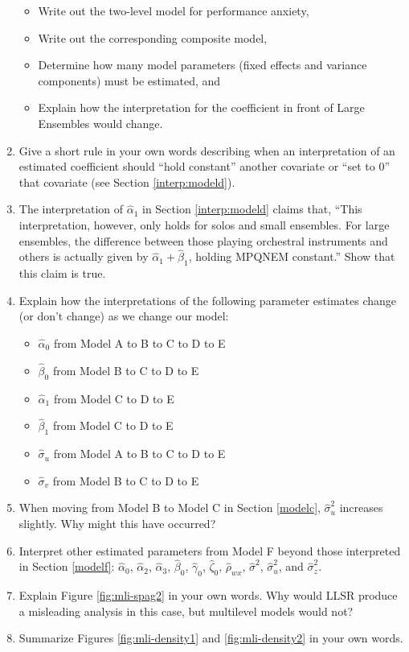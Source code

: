 \documentclass[
]{krantz}
\providecommand{\tightlist}{%
  \setlength{\itemsep}{0pt}\setlength{\parskip}{0pt}}
\begin{document}
\begin{enumerate}
  \begin{itemize}
  \tightlist
  \item
    Write out the two-level model for performance anxiety,
  \item
    Write out the corresponding composite model,
  \item
    Determine how many model parameters (fixed effects and variance components) must be estimated, and
  \item
    Explain how the interpretation for the coefficient in front of Large Ensembles would change.
  \end{itemize}
\item
  Give a short rule in your own words describing when an interpretation of an estimated coefficient should ``hold constant'' another covariate or ``set to 0'' that covariate (see Section \ref{interp:modeld}).
\item
  The interpretation of \(\hat{\alpha}_{1}\) in Section \ref{interp:modeld} claims that, ``This interpretation, however, only holds for solos and small ensembles. For large ensembles, the difference between those playing orchestral instruments and others is actually given by \(\hat{\alpha}_{1}+\hat{\beta}_{1}\), holding MPQNEM constant.'' Show that this claim is true.
\item
  Explain how the interpretations of the following parameter estimates change (or don't change) as we change our model:

  \begin{itemize}
  \tightlist
  \item
    \(\hat{\alpha}_{0}\) from Model A to B to C to D to E
  \item
    \(\hat{\beta}_{0}\) from Model B to C to D to E
  \item
    \(\hat{\alpha}_{1}\) from Model C to D to E
  \item
    \(\hat{\beta}_{1}\) from Model C to D to E
  \item
    \(\hat{\sigma}_{u}\) from Model A to B to C to D to E
  \item
    \(\hat{\sigma}_{v}\) from Model B to C to D to E
  \end{itemize}
\item
  When moving from Model B to Model C in Section \ref{modelc}, \(\hat{\sigma}_{u}^{2}\) increases slightly. Why might this have occurred?
\item
  Interpret other estimated parameters from Model F beyond those interpreted in Section \ref{modelf}: \(\hat{\alpha}_{0}\), \(\hat{\alpha}_{2}\), \(\hat{\alpha}_{3}\), \(\hat{\beta}_{0}\), \(\hat{\gamma}_{0}\), \(\hat{\zeta}_{0}\), \(\hat{\rho}_{wx}\), \(\hat{\sigma}^{2}\), \(\hat{\sigma}_{u}^{2}\), and \(\hat{\sigma}_{z}^{2}\).
\item
  Explain Figure \ref{fig:mli-spag2} in your own words. Why would LLSR produce a misleading analysis in this case, but multilevel models would not?
\item
  Summarize Figures \ref{fig:mli-density1} and \ref{fig:mli-density2} in your own words.
\end{enumerate}
\end{document}
